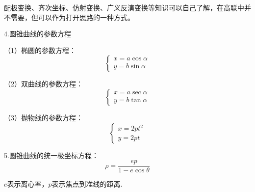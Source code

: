 配极变换、齐次坐标、仿射变换、广义反演变换等知识可以自己了解，在高联中并不需要，但可以作为打开思路的一种方式。

4.圆锥曲线的参数方程

（1）椭圆的参数方程：
$$
\begin{cases}
    x=a\cos{\alpha}\\
    y=b\sin{\alpha}
\end{cases}
$$

（2）双曲线的参数方程：
$$
\begin{cases}
    x=a\sec{\alpha}\\
    y=b\tan{\alpha}
\end{cases}
$$

（3）抛物线的参数方程：
$$
\begin{cases}
    x=2pt^2\\
    y=2pt
\end{cases}
$$

5.圆锥曲线的统一极坐标方程：
$$\rho=\dfrac{ep}{1-e\cos{\theta}}$$

$e$表示离心率，$p$表示焦点到准线的距离.
